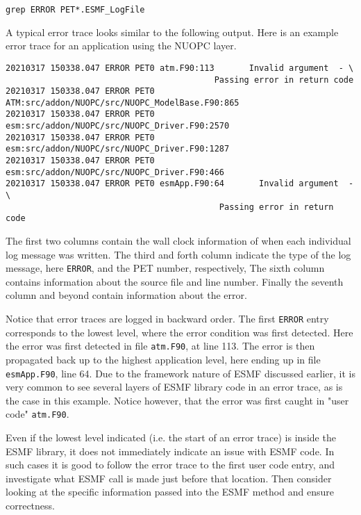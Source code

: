 \begin{verbatim}
grep ERROR PET*.ESMF_LogFile
\end{verbatim}

A typical error trace looks similar to the following output. Here is an example
error trace for an application using the NUOPC layer.

\begin{verbatim}
20210317 150338.047 ERROR PET0 atm.F90:113       Invalid argument  - \
                                          Passing error in return code
20210317 150338.047 ERROR PET0 ATM:src/addon/NUOPC/src/NUOPC_ModelBase.F90:865
20210317 150338.047 ERROR PET0 esm:src/addon/NUOPC/src/NUOPC_Driver.F90:2570
20210317 150338.047 ERROR PET0 esm:src/addon/NUOPC/src/NUOPC_Driver.F90:1287
20210317 150338.047 ERROR PET0 esm:src/addon/NUOPC/src/NUOPC_Driver.F90:466
20210317 150338.047 ERROR PET0 esmApp.F90:64       Invalid argument  - \
                                           Passing error in return code
\end{verbatim}

The first two columns contain the wall clock information of when each individual
log message was written. The third and forth column indicate the type of the log
message, here {\tt ERROR}, and the PET number, respectively, The sixth column
contains information about the source file and line number. Finally the seventh
column and beyond contain information about the error.

Notice that error traces are logged in backward order. The first {\tt ERROR}
entry corresponds to the lowest level, where the error condition was first
detected. Here the error was first detected in file {\tt atm.F90}, at line 113.
The error is then propagated back up to the highest application level,
here ending up in file {\tt esmApp.F90}, line 64. Due to the framework nature
of ESMF discussed earlier, it is very common to see several layers of ESMF
library code in an error trace, as is the case in this example. Notice however,
that the error was first caught in "user code" {\tt atm.F90}.

Even if the lowest level indicated (i.e. the start of an error trace) is inside
the ESMF library, it does not immediately indicate an issue with ESMF code. In
such cases it is good to follow the error trace to the first user code entry,
and investigate what ESMF call is made just before that location.
Then consider looking at the specific information passed into the ESMF method
and ensure correctness.

